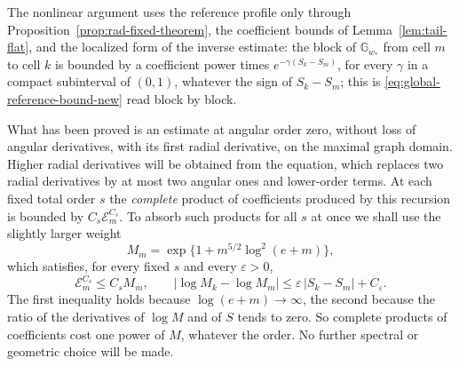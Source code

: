 The nonlinear argument uses the reference profile only through
Proposition~\ref{prop:rad-fixed-theorem}, the coefficient bounds of
Lemma~\ref{lem:tail-flat}, and the localized form of the inverse
estimate: the block of $\mathbb G_{w_*}$ from cell $m$ to cell $k$ is
bounded by a coefficient power times $e^{-\gamma(S_k-S_m)}$, for every
$\gamma$ in a compact subinterval of $(0,1)$, whatever the sign of
$S_k-S_m$; this is \eqref{eq:global-reference-bound-new} read block by
block.

What has been proved is an estimate at angular order zero, without
loss of angular derivatives, with its first radial derivative, on the
maximal graph domain. Higher radial derivatives will be obtained from
the equation, which replaces two radial derivatives by at most two
angular ones and lower-order terms. At each fixed total order $s$ the
\emph{complete} product of coefficients produced by this recursion is
bounded by $C_s\mathcal E_m^{C_s}$. To absorb such products for all
$s$ at once we shall use the slightly larger weight
\begin{equation}\label{eq:M-weight}
 M_m=\exp\bigl\{1+m^{5/2}\log^2(e+m)\bigr\},
\end{equation}
which satisfies, for every fixed $s$ and every $\varepsilon>0$,
\[
 \mathcal E_m^{C_s}\le C_sM_m,\qquad
 |\log M_k-\log M_m|\le\varepsilon\,|S_k-S_m|+C_\varepsilon .
\]
The first inequality holds because $\log(e+m)\to\infty$, the second
because the ratio of the derivatives of $\log M$ and of $S$ tends to
zero. So complete products of coefficients cost one power of $M$,
whatever the order. No further spectral or geometric choice will be
made.
